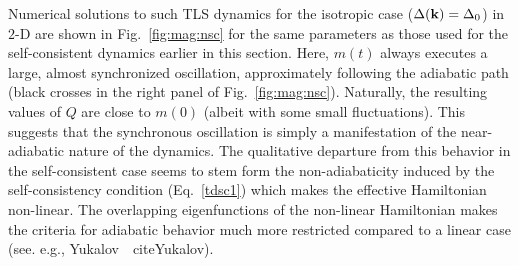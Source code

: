 \documentclass[aps,pra,floats,epsfig,pdflatex]{revtex4}                                                              %
\begin{document}
Numerical solutions to such TLS dynamics for the isotropic case ($\Delta({\bf k})=\Delta_0$) in $2$-D are shown in Fig.~\ref{fig:mag:nsc} for the same parameters as those used for the self-consistent dynamics earlier in this section. Here, $m(t)$ always executes a large, almost synchronized oscillation, approximately following the adiabatic path (black crosses in the right panel of Fig.~\ref{fig:mag:nsc}). Naturally, the resulting values of $Q$ are close to $m(0)$ (albeit with some small fluctuations). This suggests that the synchronous oscillation is simply a manifestation of the near-adiabatic nature of the dynamics. The qualitative departure from this behavior in the self-consistent case seems to stem form the non-adiabaticity induced by the self-consistency condition (Eq.~\ref{tdsc1}) which makes the effective Hamiltonian non-linear. The overlapping eigenfunctions of the non-linear Hamiltonian makes the criteria for adiabatic behavior much more restricted compared to a linear case (see. e.g., Yukalov~\
cite{Yukalov}).
\end{document}
